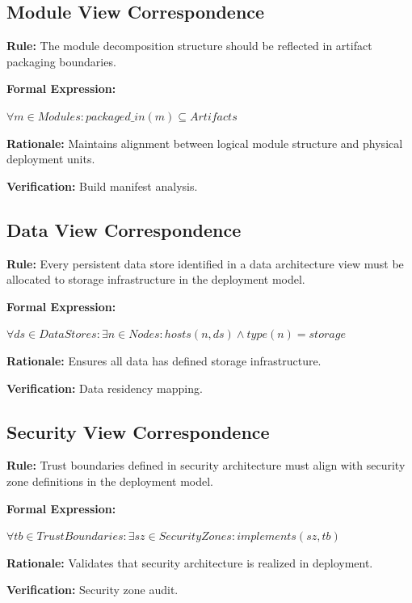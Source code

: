 \documentclass[11pt,letterpaper]{article}
\begin{document}
\subsection{Module View Correspondence}

\begin{definitionbox}
\textbf{Rule:} The module decomposition structure should be reflected in artifact packaging boundaries.

\textbf{Formal Expression:}
\begin{center}
$\forall m \in Modules : packaged\_in(m) \subseteq Artifacts$
\end{center}

\textbf{Rationale:} Maintains alignment between logical module structure and physical deployment units.

\textbf{Verification:} Build manifest analysis.
\end{definitionbox}

\subsection{Data View Correspondence}

\begin{definitionbox}
\textbf{Rule:} Every persistent data store identified in a data architecture view must be allocated to storage infrastructure in the deployment model.

\textbf{Formal Expression:}
\begin{center}
$\forall ds \in DataStores : \exists n \in Nodes : hosts(n, ds) \land type(n) = storage$
\end{center}

\textbf{Rationale:} Ensures all data has defined storage infrastructure.

\textbf{Verification:} Data residency mapping.
\end{definitionbox}

\subsection{Security View Correspondence}

\begin{definitionbox}
\textbf{Rule:} Trust boundaries defined in security architecture must align with security zone definitions in the deployment model.

\textbf{Formal Expression:}
\begin{center}
$\forall tb \in TrustBoundaries : \exists sz \in SecurityZones : implements(sz, tb)$
\end{center}

\textbf{Rationale:} Validates that security architecture is realized in deployment.

\textbf{Verification:} Security zone audit.
\end{definitionbox}
\end{document}
